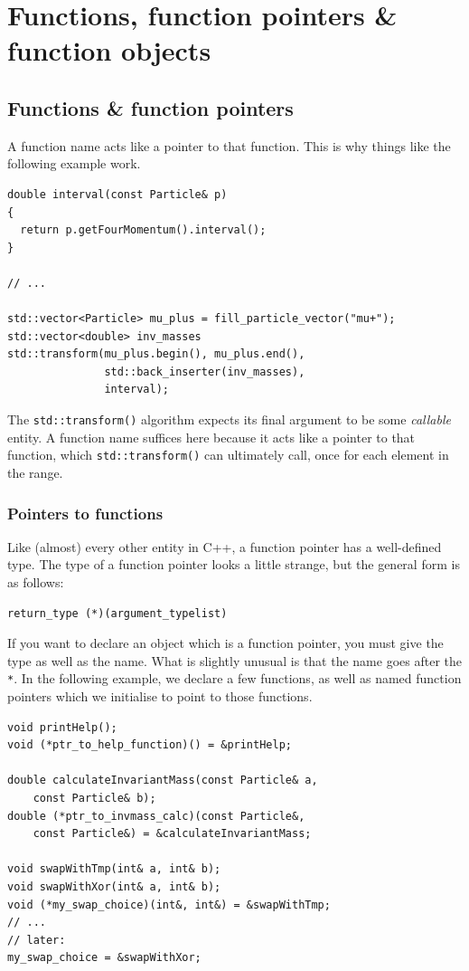 \documentclass[a4paper]{scrartcl}
\begin{document}
\section{Functions, function pointers \& function objects}
\subsection{Functions \& function pointers}
A function name acts like a pointer to that function. This is why things like the following example work.
\begin{verbatim}
double interval(const Particle& p)
{
  return p.getFourMomentum().interval();
}

// ...

std::vector<Particle> mu_plus = fill_particle_vector("mu+");
std::vector<double> inv_masses
std::transform(mu_plus.begin(), mu_plus.end(),
               std::back_inserter(inv_masses),
               interval);
\end{verbatim}

The \verb|std::transform()| algorithm expects its final argument to be some \emph{callable} entity. A function name suffices here because it acts like a pointer to that function, which \verb|std::transform()| can ultimately call, once for each element in the range.

\subsubsection{Pointers to functions}
Like (almost) every other entity in C++, a function pointer has a well-defined type. The type of a function pointer looks a little strange, but the general form is as follows:
\begin{verbatim}
return_type (*)(argument_typelist)
\end{verbatim}

If you want to declare an object which is a function pointer, you must give the type as well as the name. What is slightly unusual is that the name goes after the \verb|*|. In the following example, we declare a few functions, as well as named function pointers which we initialise to point to those functions.

\begin{verbatim}
void printHelp(); 
void (*ptr_to_help_function)() = &printHelp;

double calculateInvariantMass(const Particle& a,
    const Particle& b);
double (*ptr_to_invmass_calc)(const Particle&,
    const Particle&) = &calculateInvariantMass;

void swapWithTmp(int& a, int& b);
void swapWithXor(int& a, int& b);
void (*my_swap_choice)(int&, int&) = &swapWithTmp;
// ...
// later:
my_swap_choice = &swapWithXor;
\end{verbatim}
\end{document}
